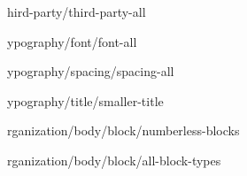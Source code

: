 
\def\loadOption #1{}

\loadOption third-party/third-party-all

\loadOption typography/font/font-all

\loadOption typography/spacing/spacing-all

\loadOption typography/title/smaller-title

\loadOption organization/body/block/numberless-blocks

\loadOption organization/body/block/all-block-types
